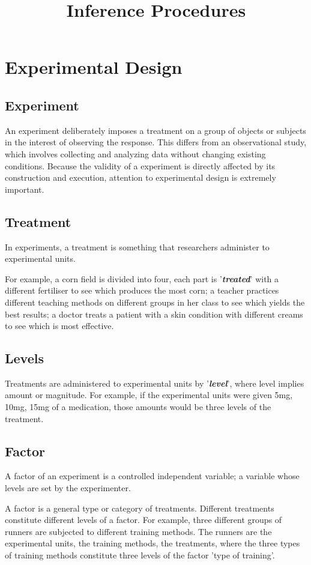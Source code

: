 \documentclass[12pt]{article}
\title{Inference Procedures}
\begin{document}
\section*{Experimental Design}

\subsection*{Experiment}
An experiment deliberately imposes a treatment on a group of objects or subjects in the interest of observing the response. This differs from an observational study, which involves collecting and analyzing data without changing existing conditions. Because the validity of a experiment is directly affected by its construction and execution, attention to experimental design is extremely important.

\subsection*{Treatment}

In experiments, a treatment is something that researchers administer to experimental units.

 
 For example, a corn field is divided into four, each part is '\textbf{\textit{treated}}' with a different fertiliser to see which produces the most corn; a teacher practices different teaching methods on different groups in her class to see which yields the best results; a doctor treats a patient with a skin condition with different creams to see which is most effective. 
 
\subsection*{Levels}
 Treatments are administered to experimental units by '\textit{\textbf{level}}', where level implies amount or magnitude. For example, if the experimental units were given 5mg, 10mg, 15mg of a medication, those amounts would be three levels of the treatment. 

\subsection*{Factor}

A factor of an experiment is a controlled independent variable; a variable whose levels are set by the experimenter.

A factor is a general type or category of treatments. Different treatments constitute different levels of a factor. For example, three different groups of runners are subjected to different training methods. The runners are the experimental units, the training methods, the treatments, where the three types of training methods constitute three levels of the factor 'type of training'. 
\end{document}
